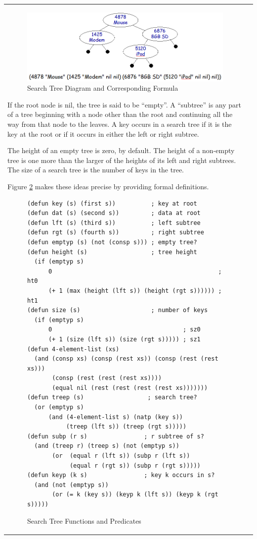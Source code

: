 \begin{tabular}{ll}
\begin{figure}
\begin{center}
\includegraphics[scale=0.5]{images/searchtree.png}
\end{center}
\caption{Search Tree Diagram and Corresponding Formula}
\label{fig:searchtree-diagram}
\end{figure}

\label{empty-tree}
If the root node is nil, the tree is said to be ``empty''.
\label{subtree}
A ``subtree'' is any part of a tree beginning with a node
other than the root
and continuing all the way from that node to the leaves.
A key occurs in a search tree if it is the key at the root
or if it occurs in either the left or right subtree.

The height of an empty tree is zero, by default.
The height of a non-empty tree is one more than the 
larger of the heights of its left and right subtrees.
The size of a search tree is the number of keys in the tree.

Figure \ref{fig:tree-functions} makes these ideas precise
by providing formal definitions.

\begin{figure}
\begin{center}
\begin{lstlisting}
(defun key (s) (first s))          ; key at root
(defun dat (s) (second s))         ; data at root
(defun lft (s) (third s))          ; left subtree
(defun rgt (s) (fourth s))         ; right subtree
(defun emptyp (s) (not (consp s))) ; empty tree?
(defun height (s)                  ; tree height
  (if (emptyp s)
      0                                               ; ht0
      (+ 1 (max (height (lft s)) (height (rgt s)))))) ; ht1
(defun size (s)                    ; number of keys
  (if (emptyp s)
      0                                     ; sz0
      (+ 1 (size (lft s)) (size (rgt s))))) ; sz1
(defun 4-element-list (xs)
  (and (consp xs) (consp (rest xs)) (consp (rest (rest xs)))
       (consp (rest (rest (rest xs))))
       (equal nil (rest (rest (rest (rest xs)))))))
(defun treep (s)                  ; search tree?
  (or (emptyp s)
      (and (4-element-list s) (natp (key s))
           (treep (lft s)) (treep (rgt s)))))
(defun subp (r s)                ; r subtree of s?
  (and (treep r) (treep s) (not (emptyp s))
       (or  (equal r (lft s)) (subp r (lft s))
            (equal r (rgt s)) (subp r (rgt s)))))
(defun keyp (k s)                ; key k occurs in s?
  (and (not (emptyp s))
       (or (= k (key s)) (keyp k (lft s)) (keyp k (rgt s)))))
\end{lstlisting}
\end{center}
\caption{Search Tree Functions and Predicates}
\label{fig:tree-functions}
\end{figure}


\end{tabular}
